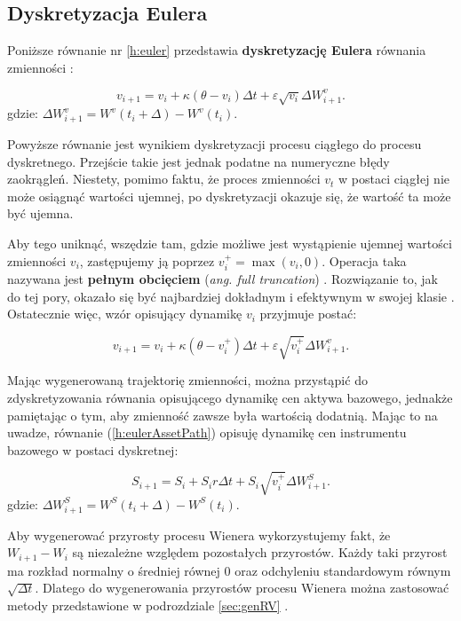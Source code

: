 \documentclass{pracamgr}
\begin{document}
\subsection{Dyskretyzacja Eulera}

Poniższe równanie nr \ref{h:euler} przedstawia \textbf{dyskretyzację Eulera} równania 
zmienności \cite{Broadie}:
 
\begin{equation}\label{h:euler}
v_{i+1}  = v_i + \kappa (\theta - v_i) \Delta t + \varepsilon  \sqrt{v_i} \Delta W^{v}_{i+1}.
\end{equation}
gdzie: $\Delta W^{v}_{i+1} = W^{v} (t_i+\Delta) - W^{v} (t_i)$.

Powyższe równanie jest wynikiem dyskretyzacji procesu ciągłego do procesu dyskretnego. Przejście
takie jest jednak podatne na numeryczne błędy zaokrągleń. Niestety, pomimo faktu, że 
proces zmienności $v_t$ w postaci ciągłej nie może osiągnąć wartości ujemnej, po 
dyskretyzacji okazuje się, że wartość ta może być ujemna. 

Aby tego uniknąć, wszędzie tam, gdzie możliwe jest wystąpienie ujemnej 
wartości zmienności $v_i$, zastępujemy ją poprzez $v_i^+ = \max(v_i, 0)$. Operacja taka nazywana jest 
\textbf{pełnym obcięciem} (\textit{ang. full truncation}) \cite{Lord}.
Rozwiązanie to, jak do tej pory, okazało się być najbardziej dokładnym i 
efektywnym w swojej klasie \cite{Malham}. Ostatecznie więc, wzór opisujący dynamikę $v_i$ przyjmuje 
postać:

\begin{equation}\label{h:eulerNonZero}
v_{i+1}  = v_i + \kappa (\theta - v_i^+) \Delta t + \varepsilon \sqrt{v_i^+} \Delta W^{v}_{i+1}.
\end{equation}

Mając wygenerowaną trajektorię zmienności, można przystąpić do zdyskretyzowania równania opisującego 
dynamikę cen aktywa bazowego, jednakże pamiętając o tym, aby zmienność zawsze była wartością 
dodatnią. 
Mając to na uwadze, równanie (\ref{h:eulerAssetPath}) opisuję dynamikę cen instrumentu bazowego w 
postaci dyskretnej:

\begin{equation}\label{h:eulerAssetPath}
S_{i+1} = S_i + S_i r \Delta t + S_i \sqrt{v_i^+}  \Delta W_{i+1}^S.
\end{equation}
gdzie: $\Delta W^{S}_{i+1} = W^{S} (t_i+\Delta) - W^{S} (t_i)$.
  
Aby wygenerować przyrosty procesu Wienera wykorzystujemy fakt, że $W_{i+1}  - W_{i}$ są niezależne 
względem pozostałych przyrostów. 
Każdy taki przyrost ma rozkład normalny o średniej równej $0$ oraz odchyleniu standardowym 
równym $\sqrt{\Delta t}$. 
Dlatego do wygenerowania przyrostów procesu Wienera można zastosować metody przedstawione w 
podrozdziale \ref{sec:genRV} \cite{Glasserman}.
\end{document}
